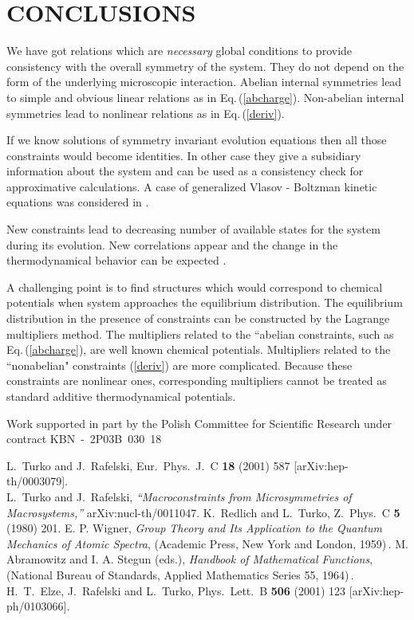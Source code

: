\documentclass[a4paper,aps]{revtex4}
\begin{document}
\section{CONCLUSIONS}

We have got relations which are {\it necessary} global conditions
to provide consistency with the overall symmetry of the system.
They do not depend on the form of the underlying microscopic
interaction.  Abelian internal symmetries lead to simple and
obvious linear relations as in Eq.\,(\ref{abcharge}). Non-abelian
internal symmetries lead to nonlinear relations as in
Eq.\,(\ref{deriv}).

If we know solutions of symmetry invariant evolution equations then all
those constraints would become identities. In other case they give a
subsidiary information about the system and can be  used as a
consistency check for approximative calculations. A case of generalized
Vlasov - Boltzman kinetic equations was considered in \cite{TurRaf}.

New constraints lead to decreasing number of available states for
the system during its evolution. New correlations appear and the
change in the thermodynamical behavior can be expected
\cite{Elze:2001ss}.

A challenging point is to find structures which would correspond
to chemical potentials when system approaches the equilibrium
distribution. The equilibrium distribution in the presence of
constraints can be constructed by the Lagrange multipliers method.
The multipliers related to the ``abelian constraints, such as
Eq.\,(\ref{abcharge}), are well known chemical potentials.
Multipliers related to the ``nonabelian" constraints (\ref{deriv})
are more complicated.  Because these constraints are nonlinear
ones, corresponding multipliers cannot be treated as standard
additive thermodynamical potentials.

\begin{acknowledgments}
Work supported in part by the Polish Committee for Scientific
Research under contract KBN~-~2P03B~030~18
\end{acknowledgments}

\begin{thebibliography}{99}
L.~Turko and J.~Rafelski,
Eur.\ Phys.\ J.\ C {\bf 18} (2001) 587 [arXiv:hep-th/0003079].\\
L.~Turko and J.~Rafelski, \textit{``Macroconstraints from
Microsymmetries of Macrosystems,''} arXiv:nucl-th/0011047.
K.~Redlich and L.~Turko,
Z.\ Phys.\ C {\bf 5} (1980) 201.
E. P. Wigner, {\it Group Theory and Its Application to the Quantum
Mechanics of Atomic Spectra}, (Academic Press, New York and
London, 1959)\,.
 M. Abramowitz and I. A. Stegun (eds.), {\it Handbook of
Mathematical Functions}, (National Bureau of Standards, Applied
Mathematics Series \myHighlight{$\cdot$}\coordHE{}  55, 1964)\,.
H.~T.~Elze, J.~Rafelski and L.~Turko,
Phys.\ Lett.\ B {\bf 506} (2001) 123 [arXiv:hep-ph/0103066].


\end{thebibliography}
\end{document}
